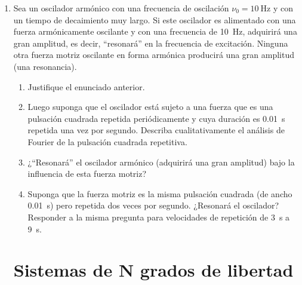 \documentclass[11pt,spanish,a4paper]{article}
\begin{document}
\begin{enumerate}
\item Sea un oscilador armónico con una frecuencia de oscilación \(\nu_0= \SI{10}{\hertz}\) y con un tiempo de decaimiento muy largo.
Si este oscilador es alimentado con una fuerza armónicamente oscilante y con una frecuencia de \SI{10}{\hertz}, adquirirá una gran amplitud, es decir, ``resonará'' en la frecuencia de excitación.
Ninguna otra fuerza motriz oscilante en forma armónica producirá una gran amplitud (una resonancia). 
\begin{enumerate}
	\item Justifique el enunciado anterior. 
	\item Luego suponga que el oscilador está sujeto a una fuerza que es una pulsación cuadrada repetida periódicamente y cuya duración es \SI{0.01}{\second} repetida una vez por segundo.
	Describa cualitativamente el análisis de Fourier de la pulsación cuadrada repetitiva. 
	\item ¿``Resonará'' el oscilador armónico (adquirirá una gran amplitud) bajo la influencia de esta fuerza motriz?
	\item Suponga que la fuerza motriz es la misma pulsación cuadrada (de ancho \SI{0.01}{\second}) pero repetida dos veces por segundo.
	¿Resonará el oscilador?
	Responder a la misma pregunta para velocidades de repetición de \SI{3}{\second} a \SI{9}{\second}.
\end{enumerate}


\section*{Sistemas de N grados de libertad}


\end{enumerate}
\end{document}
